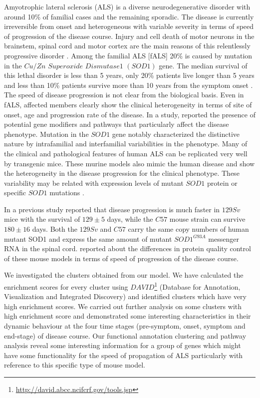 Amyotrophic lateral sclerosis (ALS) is a diverse neurodegenerative
disorder with around 10\% of familial cases and the remaining
sporadic. The disease is currently irreversible from onset and
heterogeneous with variable severity in terms of speed of progression
of the disease course. Injury and cell death of motor neurons in the
brainstem, spinal cord and motor cortex are the main reasons of this
relentlessly progressive disorder \cite{Brockington:2013, Ferraiuolo:2011, 
Haverkamp:1995, Peviani:2010}. Among the
familial ALS [fALS] 20\% is caused by mutation in the $Cu/Zn$ 
$Superoxide$ $Dismutase 1$ $(SOD1)$ gene. The median survival of this
lethal disorder is less than 5 years, only 20\% patients live longer
than 5 years and less than 10\% patients survive more than 10 years
from the symptom onset \cite{Beghi:2011, Saccon:2013}. The speed of
disease progression is not clear from the biological basis. Even in
fALS, affected members clearly show the clinical heterogeneity in
terms of site of onset, age and progression rate of the disease.
In a study, \cite{Camu:1999} reported the presence of potential gene modifiers and
pathways that particularly affect the disease phenotype. Mutation in
the $SOD1$ gene notably characterized the distinctive nature by
intrafamilial and interfamilial variabilities in the phenotype.  Many
of the clinical and pathological features of human ALS can be
replicated very well by transgenic mice. These murine models also
mimic the human disease and show the heterogeneity in the disease
progression for the clinical phenotype. These variability may be
related with expression levels of mutant $SOD1$ protein or specific
$SOD1$ mutations \cite{Turner:2008}.

In a previous study \cite{Pizzasegola:2009} reported that
disease progression is much faster in $129Sv$ mice with the survival
of $129\pm5$ days, while the $C57$ mouse strain can survive $180\pm16$
days. Both the $129Sv$ and $C57$ carry the same copy numbers of human
mutant SOD1 and express the same amount of mutant $SOD1^{G93A}$
messenger RNA in the spinal cord.  \cite{Marino:2015} reported about
the differences in protein quality control of these mouse models in
terms of speed of progression of the disease course.

We investigated the clusters obtained from our
model. We have calculated the enrichment scores
\cite{Huang:2009Enrichment} for every cluster using
$DAVID$\footnote{\url{http://david.abcc.ncifcrf.gov/tools.jsp}}
(Database for Annotation, Visualization and Integrated Discovery)
\cite{Huang:2009David} and identified clusters which have very
high enrichment scores.  We carried out further analysis on some
clusters with high enrichment score and demonstrated some interesting
characteristics in their dynamic behaviour at the four time stages
(pre-symptom, onset, symptom and end-stage) of disease course.  Our
functional annotation clustering and pathway analysis reveal some
interesting information for a group of genes which might have some
functionality for the speed of propagation of ALS particularly with
reference to this specific type of mouse model.

